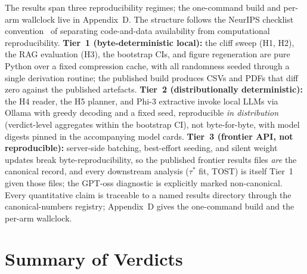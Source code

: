 The results span three reproducibility regimes; the one-command
build and per-arm wallclock live in Appendix~D. The structure follows the NeurIPS checklist
convention~\cite{pineau2021checklist} of separating code-and-data
availability from computational reproducibility.
\textbf{Tier~1 (byte-deterministic local):} the cliff sweep (H1, H2),
the RAG evaluation (H3), the bootstrap CIs, and figure regeneration
are pure Python over a fixed compression cache, with all randomness
seeded through a single derivation routine; the published build
produces CSVs and PDFs that diff zero against the published
artefacts. \textbf{Tier~2 (distributionally deterministic):} the H4
reader, the H5 planner, and Phi-3 extractive invoke local LLMs via
Ollama with greedy decoding and a fixed seed, reproducible \emph{in
distribution} (verdict-level aggregates within the bootstrap CI), not
byte-for-byte, with model digests pinned in the accompanying model
cards. \textbf{Tier~3 (frontier API, not reproducible):} server-side
batching, best-effort seeding, and silent weight updates break
byte-reproducibility, so the published frontier results files
\emph{are} the canonical record, and every downstream analysis
($\tau^{*}$ fit, TOST) is itself Tier~1 given those files; the
GPT-oss diagnostic is explicitly marked non-canonical. Every
quantitative claim is traceable to a named results directory through
the canonical-numbers registry; Appendix~D gives the one-command
build and the per-arm wallclock.

\section{Summary of Verdicts}
\label{sec:verdict_summary}


